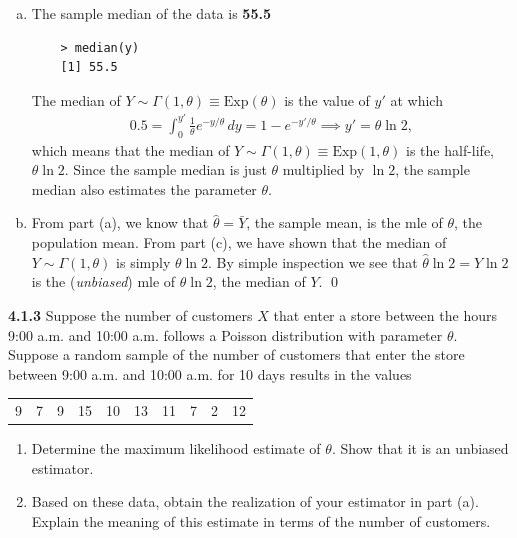 \documentclass{book}
\theoremstyle{definition}
\newcommand{\f}[2]{\frac{#1}{#2}}
\begin{document}
\begin{enumerate}[(a)]
	
	
	
	\item The sample median of the data is \textbf{55.5}
	\begin{lstlisting}
	> median(y)
	[1] 55.5
	\end{lstlisting}
	The median of $Y \sim \Gamma(1,\theta) \equiv \text{Exp}(\theta)$ is the value of $y'$ at which 
	\begin{align}
	0.5 = \int^{y'}_{0}\f{1}{\theta}e^{-y/\theta}\,dy = 1 - e^{-y'/\theta} \implies y' = \theta \ln 2,
	\end{align} 
	which means that the median of $Y \sim \Gamma(1,\theta) \equiv \text{Exp}(1,\theta)$ is the half-life, $\theta \ln 2$. Since the sample median is just $\theta$ multiplied by $\ln 2$, the sample median also estimates the parameter $\theta$. 
	
	
	
	\item From part (a), we know that $\hat{\theta} = \bar{Y}$, the sample mean, is the mle of $\theta$, the population mean. From part (c), we have shown that the median of $Y \sim \Gamma(1,\theta)$ is simply $\theta \ln 2$. By simple inspection we see that $\hat{\theta}\ln 2 = \hat{Y} \ln 2$ is the (\textit{unbiased}) mle of $\theta \ln 2$, the median of $Y$. \qed 
	
	
	
\end{enumerate}








\newpage

\noindent \textbf{4.1.3} Suppose the number of customers $X$ that enter a store between the hours
9:00 a.m. and 10:00 a.m. follows a Poisson distribution with parameter $\theta$. Suppose
a random sample of the number of customers that enter the store between 9:00 a.m.
and 10:00 a.m. for 10 days results in the values\\

\begin{tabular}{c c c c c c c c c c}
	9& 7& 9 &15& 10& 13& 11& 7 &2& 12
\end{tabular}


\begin{enumerate}
	\item Determine the maximum likelihood estimate of $\theta$. Show that it is an unbiased
	estimator.
	
	\item Based on these data, obtain the realization of your estimator in part (a).
	Explain the meaning of this estimate in terms of the number of customers.
	
\end{enumerate}
\end{document}
